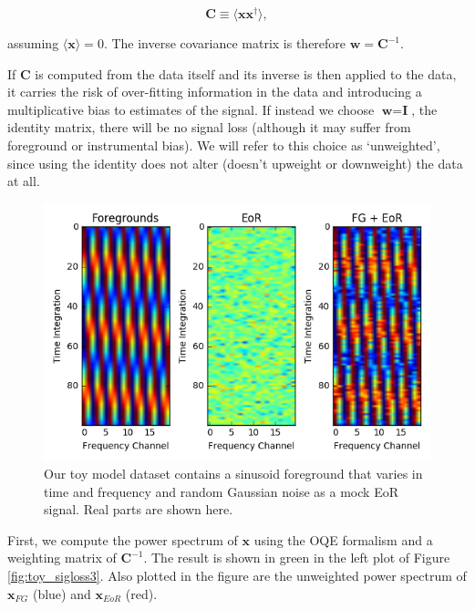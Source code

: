\documentclass[preprint2,numberedappendix,tighten,twocolappendix]{aastex6}  %
\begin{document}
\begin{equation}
\textbf{C} \equiv \langle\textbf{xx}^{\dagger}\rangle,
\end{equation}

assuming $\langle\textbf{x}\rangle = 0$. The inverse covariance matrix is therefore $\textbf{w} = \textbf{C}^{-1}$.

If $\textbf{C}$ is computed from the data itself and its inverse is then applied to the data, it carries the risk of over-fitting information in the data and introducing a multiplicative bias to estimates of the signal. If instead we choose $\textbf{w} = \textbf{I}$, the identity matrix, there will be no signal loss (although it may suffer from foreground or instrumental bias). We will refer to this choice as `unweighted', since using the identity does not alter (doesn't upweight or downweight) the data at all.

\begin{figure}
	\centering
	\includegraphics[trim={0.3cm 0.2cm 0.3cm 0.3cm},clip,width=\columnwidth]{plots/toy_sigloss1.png}
	\caption{Our toy model dataset contains a sinusoid foreground that varies in time and frequency and random Gaussian noise as a mock EoR signal. Real parts are shown here.}
	\label{fig:toy_sigloss1}
\end{figure}

First, we compute the power spectrum of $\textbf{x}$ using the OQE formalism and a weighting matrix of $\textbf{C}^{-1}$. The result is shown in green in the left plot of Figure \ref{fig:toy_sigloss3}. Also plotted in the figure are the unweighted power spectrum of $\textbf{x}_{FG}$ (blue) and $\textbf{x}_{EoR}$ (red). 
\end{document}
